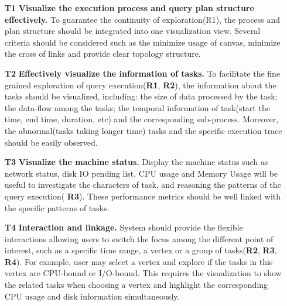 \begin{itemize}
  \item[\textbf{T1}]\textbf{Visualize the execution process and query plan structure effectively.} To guarantee the continuity of exploration(R1), the process and plan structure should be integrated into one visualization view. Several criteria should be considered such as the minimize usage of canvas, minimize the cross of links and provide clear topology structure.
  \item[\textbf{T2}]\textbf{Effectively visualize the information of tasks.} To facilitate the fine grained exploration of query execution(\textbf{R1}, \textbf{R2}), the information about the tasks should be visualized, including: the size of data processed by the task; the data-flow among the tasks; the temporal information of task(start the time, end time, duration, etc) and the corresponding sub-process. Moreover, the abnormal(tasks taking longer time) tasks and the specific execution trace should be easily observed.
  \item[\textbf{T3}]\textbf{Visualize the machine status.} Display the machine status such as network status, disk IO pending list, CPU usage and Memory Usage will be useful to investigate the characters of task, and reasoning the patterns of the query execution( \textbf{R3}). These performance metrics should be well linked with the specific patterns of tasks. 
  \item[\textbf{T4}]\textbf{Interaction and linkage.} System should provide the flexible interactions allowing users to switch the focus among the different point of interest, such as a specific time range, a vertex or a group of tasks(\textbf{R2}, \textbf{R3}, \textbf{R4}). For example, user may select a vertex and explore if the tasks in this vertex are CPU-bound or I/O-bound. This requires the visualization to show the related tasks when choosing a vertex and highlight the corresponding CPU usage and disk information simultaneously.


\end{itemize}


